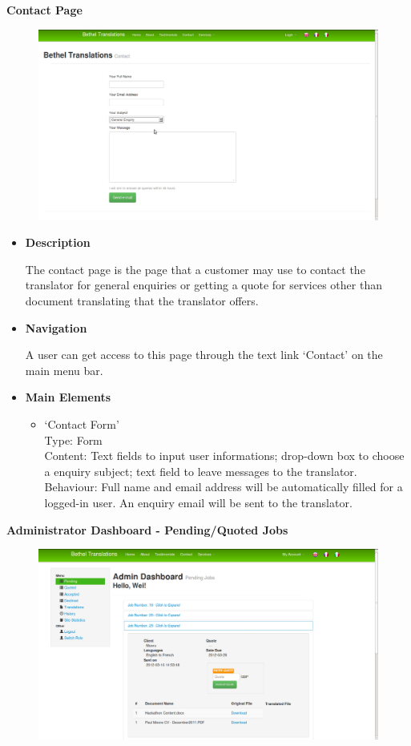 \documentclass{l3proj}
\begin{document}
\textbf{Contact Page}
\begin{figure}[H]
\centering
\includegraphics[width=0.8\linewidth]{images/contactPage}
\vspace{-30pt}
\end{figure}

\begin{itemize}
\item \textbf{Description}

The contact page is the page that a customer may use to contact the translator for general enquiries or getting a quote for services other than document translating that the translator offers. 

\item \textbf{Navigation}

A user can get access to this page through the text link `Contact' on the main menu bar.

\item \textbf{Main Elements}
\begin{itemize}
\item `Contact Form'\\
Type: Form\\
Content: Text fields to input user informations; drop-down box to choose a enquiry subject; text field to leave messages to the translator. \\
Behaviour: Full name and email address will be automatically filled for a logged-in user. An enquiry email will be sent to the translator. \\

\end{itemize}
\end{itemize}

\textbf{Administrator Dashboard - Pending/Quoted Jobs}
\begin{figure}[H]
\centering
\includegraphics[width=0.8\linewidth]{images/adminDashPending}
\vspace{-30pt}
\end{figure}
\end{document}
